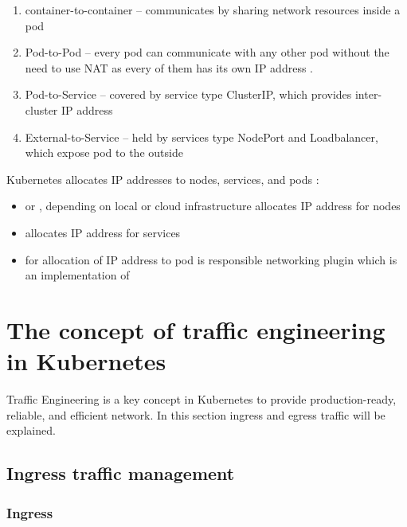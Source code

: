\begin{enumerate}
    \item container-to-container -- communicates by sharing network resources inside a pod
    \item Pod-to-Pod -- every pod can communicate with any other pod without the need to use NAT as every of them has its own IP address \cite{IBMKubernetesNetworking}.
    \item Pod-to-Service -- covered by service type ClusterIP, which provides inter-cluster IP address
    \item External-to-Service -- held by services type NodePort and Loadbalancer, which expose pod to the outside
\end{enumerate}
Kubernetes allocates IP addresses to nodes, services, and pods \cite{KubernetesClusterNetworking}:
\begin{itemize}
    \item \textit{} or \textit{}, depending on local or cloud infrastructure allocates IP address for nodes
    \item \textit{} allocates IP address for services
    \item for allocation of IP address to pod is responsible networking plugin which is an implementation of \textit{}
\end{itemize}



\section{The concept of traffic engineering in Kubernetes}
\label{sec:trafficConcept}

Traffic Engineering is a key concept in Kubernetes to provide production-ready, reliable, and efficient network. In this section ingress and egress traffic will be explained.


\subsection{Ingress traffic management}
\label{sec:ingressTrafficMngmnt}

\subsubsection{Ingress}
\label{ingress}

